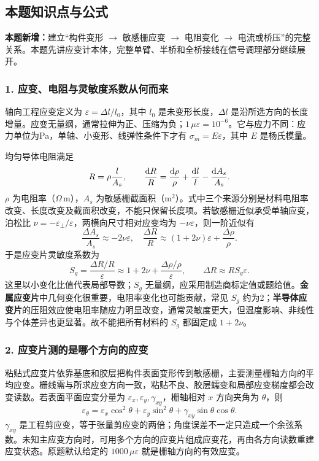 \subsection*{本题知识点与公式}\label{kn:4-1}
\noindent\textbf{本题新增：}建立“构件变形 $\to$ 敏感栅应变 $\to$ 电阻变化 $\to$ 电流或桥压”的完整关系。本题先讲应变计本体，完整单臂、半桥和全桥接线在信号调理部分继续展开。

\subsubsection*{1. 应变、电阻与灵敏度系数从何而来}
轴向工程应变定义为 $\varepsilon=\Delta l/l_0$，其中 $l_0$ 是未变形长度，$\Delta l$ 是沿所选方向的长度增量。应变无量纲，通常拉伸为正、压缩为负；$1\,\mu\varepsilon=10^{-6}$。它与应力不同：应力单位为Pa，单轴、小变形、线弹性条件下才有 $\sigma_m=E\varepsilon$，其中 $E$ 是杨氏模量。

均匀导体电阻满足
\[
R=\rho\frac{l}{A_s},\qquad
\frac{\mathrm{d} R}{R}=\frac{\mathrm{d}\rho}{\rho}
+\frac{\mathrm{d} l}{l}-\frac{\mathrm{d} A_s}{A_s}.
\]
$\rho$ 为电阻率（$\Omega\,\mathrm m$），$A_s$ 为敏感栅截面积（$\mathrm m^2$）。式中三个来源分别是材料电阻率改变、长度改变及截面积改变，不能只保留长度项。若敏感栅近似承受单轴应变，泊松比 $\nu=-\varepsilon_{\perp}/\varepsilon$，两横向尺寸相对应变均为 $-\nu\varepsilon$，则一阶近似有
\[
\frac{\Delta A_s}{A_s}\approx-2\nu\varepsilon,
\quad
\frac{\Delta R}{R}\approx(1+2\nu)\varepsilon+\frac{\Delta\rho}{\rho}.
\]
于是应变片灵敏度系数为
\[
\boxed{S_g=\frac{\Delta R/R}{\varepsilon}
\approx1+2\nu+\frac{\Delta\rho/\rho}{\varepsilon}},
\qquad \Delta R\approx RS_g\varepsilon.
\]
这里以小变化比值代表局部导数；$S_g$ 无量纲，应采用制造商标定值或题给值。\textbf{金属应变片}中几何变化很重要，电阻率变化也可能贡献，常见 $S_g$ 约为2；\textbf{半导体应变片}的压阻效应使电阻率随应力明显改变，通常灵敏度更大，但温度影响、非线性与个体差异也更显著。故不能把所有材料的 $S_g$ 都固定成 $1+2\nu$。

\subsubsection*{2. 应变片测的是哪个方向的应变}
粘贴式应变片依靠基底和胶层把构件表面变形传到敏感栅，主要测量栅轴方向的平均应变。栅线需与所求应变方向一致，粘贴不良、胶层蠕变和局部应变梯度都会改变读数。若表面平面应变分量为 $\varepsilon_x,\varepsilon_y,\gamma_{xy}$，栅轴相对 $x$ 方向夹角为 $\theta$，则
\[
\varepsilon_\theta=\varepsilon_x\cos^2\theta+
\varepsilon_y\sin^2\theta+\gamma_{xy}\sin\theta\cos\theta.
\]
$\gamma_{xy}$ 是工程剪应变，等于张量剪应变的两倍；角度误差不一定只造成一个余弦系数。未知主应变方向时，可用多个方向的应变片组成应变花，再由各方向读数重建应变状态。原题默认给定的 $1000\,\mu\varepsilon$ 就是栅轴方向的有效应变。

